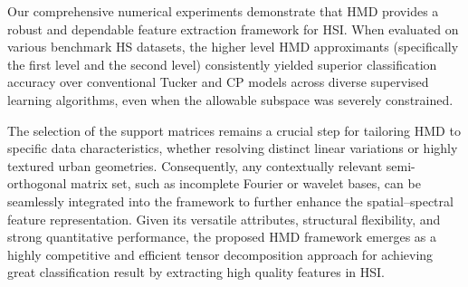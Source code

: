 \documentclass[12pt,onecolumn]{article}
\begin{document}
Our comprehensive numerical experiments demonstrate that HMD provides a robust and dependable feature extraction framework for HSI. When evaluated on various benchmark HS datasets, the higher level HMD approximants (specifically the first level and the second level) consistently yielded superior classification accuracy over conventional Tucker and CP models across diverse supervised learning algorithms, even when the allowable subspace was severely constrained.

The selection of the support matrices remains a crucial step for tailoring HMD to specific data characteristics, whether resolving distinct linear variations or highly textured urban geometries. Consequently, any contextually relevant semi-orthogonal matrix set, such as incomplete Fourier or wavelet bases, can be seamlessly integrated into the framework to further enhance the spatial–spectral feature representation. Given its versatile attributes, structural flexibility, and strong quantitative performance, the proposed HMD framework emerges as a highly competitive and efficient tensor decomposition approach for achieving great classification result by extracting high quality features in HSI.



\end{document}
